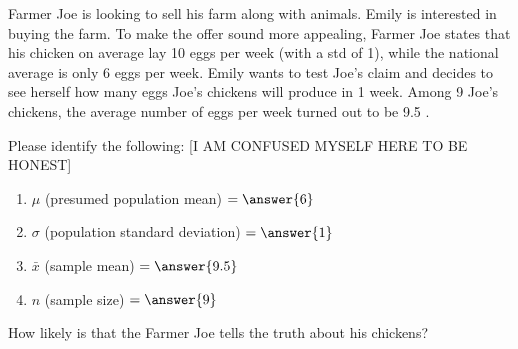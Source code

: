 \documentclass{ximera}
\begin{document}
\begin{example}
Farmer Joe is looking to sell his farm along with animals. Emily is interested in buying the farm. To make the offer sound more appealing, Farmer Joe states that his chicken on average lay 10 eggs per week (with a std of 1), while the national average is only 6 eggs per week. Emily wants to test Joe’s claim and decides to see herself how many eggs Joe's chickens will produce in 1 week. Among 9 Joe's chickens, the average number of eggs per week turned out to be 9.5 . 

\begin{question}
Please identify the following:
[I AM CONFUSED MYSELF HERE TO BE HONEST]
\begin{enumerate}
    \item $\mu$ (presumed population mean) $= \answer{6}$
    \item $\sigma$ (population standard deviation) $= \answer{1}$
    \item $\bar{x}$ (sample mean) $=\answer{9.5}$
    \item $n$ (sample size) $= \answer{9}$
\end{enumerate}
\end{question}

\begin{question}
How likely is that the Farmer Joe tells the truth about his chickens?
\begin{multipleChoice}
\end{multipleChoice}
\end{question}


\end{example}
\end{document}
